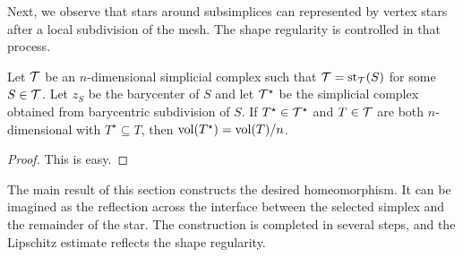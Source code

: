 \documentclass[10pt,letterpaper]{article}
\begin{document}
Next, we observe that stars around subsimplices can represented by vertex stars after a local subdivision of the mesh.
The shape regularity is controlled in that process. 

\begin{lemma}\label{lemma:stardivision}
    Let ${\mathcal T}$ be an $n$-dimensional simplicial complex
    such that ${\mathcal T} = \operatorname{st}_{{\mathcal T}}(S)$ for some $S \in {\mathcal T}$.
    Let $z_S$ be the barycenter of $S$ 
    and let ${\mathcal T}^{\star}$ be the simplicial complex obtained from barycentric subdivision of $S$.
    If $T^{\star} \in {\mathcal T}^{\star}$ and $T \in {\mathcal T}$ are both $n$-dimensional with $T^{\star} \subseteq T$,
    then $\operatorname{vol}(T^{\star}) = \operatorname{vol}(T) / n$.
\end{lemma}
\begin{proof}
    This is easy.
\end{proof}












The main result of this section constructs the desired homeomorphism. 
It can be imagined as the reflection across the interface between the selected simplex and the remainder of the star. 
The construction is completed in several steps,
and the Lipschitz estimate reflects the shape regularity. 
\end{document}
